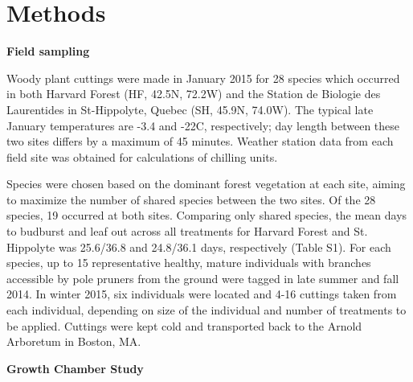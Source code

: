 \documentclass[11pt]{article}
\begin{document}
\section*{Methods}
\textbf{Field sampling}

Woody plant cuttings were made in January 2015 for 28 species which occurred in both Harvard Forest (HF, 42.5\degree N, 72.2\degree W) and the Station de Biologie des Laurentides in St-Hippolyte, Quebec (SH, 45.9\degree N, 74.0\degree W). The typical late January temperatures are -3.4 and -22\degree C, respectively; day length between these two sites differs by a maximum of 45 minutes. Weather station data from each field site was obtained for calculations of chilling units. 

Species were chosen based on the dominant forest vegetation at each site, aiming to maximize the number of shared species between the two sites. Of the 28 species, 19 occurred at both sites. Comparing only shared species, the mean days to budburst and leaf out across all treatments for Harvard Forest and St. Hippolyte was 25.6/36.8 and 24.8/36.1 days, respectively (Table S1). For each species, up to 15 representative healthy, mature individuals with branches accessible by pole pruners from the ground were tagged in late summer and fall 2014. In winter 2015, six individuals were located and 4-16 cuttings taken from each individual, depending on size of the individual and number of treatments to be applied. Cuttings were kept cold and transported back to the Arnold Arboretum in Boston, MA.

\textbf{Growth Chamber Study}
\end{document}
